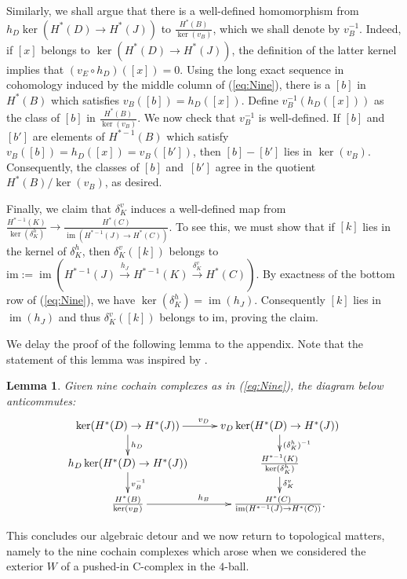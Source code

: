 \documentclass[11pt,a4paper]{amsart}
\newtheorem{lemma}[theorem]{Lemma}
\theoremstyle{definition}
\newcommand{\im}{\operatorname{im}}
\begin{document}
Similarly, we shall argue that there is a well-defined homomorphism from $h_D \ker(  H^*(D)  \to  H^*(J)) $ to $\frac{ H^*(B)}{\ker(v_B)}$, which we shall denote by $v_B^{-1}$. Indeed, if $[x]$ belongs to $\ker(  H^*(D)  \to  H^*(J))$, the definition of the latter kernel implies that $(v_E \circ h_D)([x])=0$. Using the long exact sequence in cohomology induced by the middle column of (\ref{eq:Nine}), there is a $[b]$ in $ H^*(B)$ which satisfies $v_B([b])=h_D([x])$. Define $v_B^{-1}(h_D([x]))$ as the class of $[b]$ in $\frac{ H^*(B)}{\ker(v_B)}$. We now check that $v_B^{-1}$ is well-defined. If $[b]$ and $[b']$ are elements of $H^{*-1}(B)$ which satisfy $v_B([b])=h_D([x])=v_B([b'])$, then $[b]-[b']$ lies in $\ker(v_B)$. Consequently, the classes of $[b]$ and~$[b']$ agree in the quotient $H^*(B)/\ker(v_B)$, as desired.

Finally, we claim that $\delta_K^v$ induces a well-defined map from $\frac{ H^{*-1}(K)}{\ker(\delta_K^h)} \to \frac{H^*(C)}{\im( H^{*-1}(J) \to  H^*(C))}$. To see this, we must show that if $[k]$ lies in the kernel of $\delta_K^h$, then $\delta_K^v([k])$ belongs to~$\text{im}:=\im( H^{*-1}(J) \stackrel{h_J}{\to}  H^{*-1}(K) \stackrel{\delta_K^v}{\to}  H^*(C))$. By exactness of the bottom row of (\ref{eq:Nine}), we have $\ker(\delta_K^h)=\im(h_J)$. Consequently $[k]$ lies in $\im(h_J)$ and thus $\delta_K^v([k])$ belongs to $\text{im}$, proving the claim.

We delay the proof of the following lemma to the appendix. Note that the statement of this lemma was inspired by \cite[Lemma 4.4]{BargeLannesLatourVogel}.

\begin{lemma}
\label{lem:cube}
Given nine cochain complexes as in (\ref{eq:Nine}), the diagram below anticommutes:
\begin{equation}
\label{eq:9Lemma}
 \xymatrix@R0.5cm{
\ker(  H^*(D)  \to  H^*(J)) \ar[r]^{  v_D}\ar[d]^{h_D} & v_D \ker(  H^*(D)  \to  H^*(J)) \ar[d]^{(\delta_K^h)^{-1}}\\
h_D \ker(  H^*(D)  \to  H^*(J))\ar[d]^{v_B^{-1}} & \frac{H^{*-1}(K)}{\ker(\delta_K^h)}\ar[d]^{\delta_K^v} \\
\frac{ H^*(B)}{\ker(v_B)} \ar[r]^{h_B}& \frac{ H^*(C)}{\im(H^{*-1}(J) \to  H^*(C))}.
}
\end{equation}
\end{lemma}

This concludes our algebraic detour and we now return to topological matters, namely to the nine cochain complexes which arose when we considered the exterior $W$ of a pushed-in C-complex in the $4$-ball.
\end{document}
